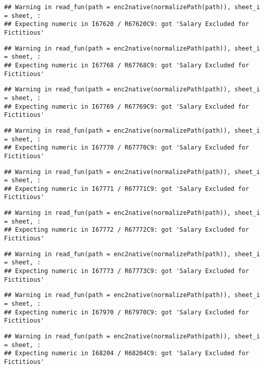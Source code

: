 \documentclass[
]{article}
\begin{document}
\begin{verbatim}
## Warning in read_fun(path = enc2native(normalizePath(path)), sheet_i = sheet, :
## Expecting numeric in I67620 / R67620C9: got 'Salary Excluded for Fictitious'
\end{verbatim}

\begin{verbatim}
## Warning in read_fun(path = enc2native(normalizePath(path)), sheet_i = sheet, :
## Expecting numeric in I67768 / R67768C9: got 'Salary Excluded for Fictitious'
\end{verbatim}

\begin{verbatim}
## Warning in read_fun(path = enc2native(normalizePath(path)), sheet_i = sheet, :
## Expecting numeric in I67769 / R67769C9: got 'Salary Excluded for Fictitious'
\end{verbatim}

\begin{verbatim}
## Warning in read_fun(path = enc2native(normalizePath(path)), sheet_i = sheet, :
## Expecting numeric in I67770 / R67770C9: got 'Salary Excluded for Fictitious'
\end{verbatim}

\begin{verbatim}
## Warning in read_fun(path = enc2native(normalizePath(path)), sheet_i = sheet, :
## Expecting numeric in I67771 / R67771C9: got 'Salary Excluded for Fictitious'
\end{verbatim}

\begin{verbatim}
## Warning in read_fun(path = enc2native(normalizePath(path)), sheet_i = sheet, :
## Expecting numeric in I67772 / R67772C9: got 'Salary Excluded for Fictitious'
\end{verbatim}

\begin{verbatim}
## Warning in read_fun(path = enc2native(normalizePath(path)), sheet_i = sheet, :
## Expecting numeric in I67773 / R67773C9: got 'Salary Excluded for Fictitious'
\end{verbatim}

\begin{verbatim}
## Warning in read_fun(path = enc2native(normalizePath(path)), sheet_i = sheet, :
## Expecting numeric in I67970 / R67970C9: got 'Salary Excluded for Fictitious'
\end{verbatim}

\begin{verbatim}
## Warning in read_fun(path = enc2native(normalizePath(path)), sheet_i = sheet, :
## Expecting numeric in I68204 / R68204C9: got 'Salary Excluded for Fictitious'
\end{verbatim}
\end{document}
